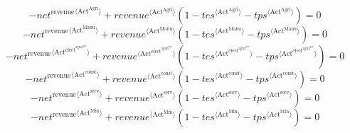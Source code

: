 \begin{equation}
-{{n\!e\!t}^{\mathrm{revenue}}}^{\langle \mathrm{Act}^{\mathrm{Agri}}\rangle} + {{{r\!e\!v\!e\!n\!u\!e}}^{\langle \mathrm{Act}^{\mathrm{Agri}}\rangle}} \left(1 - {{t\!e\!s}}^{\langle \mathrm{\mathrm{Act}^{\mathrm{Agri}}}\rangle} - {{t\!p\!s}}^{\langle \mathrm{\mathrm{Act}^{\mathrm{Agri}}}\rangle}\right) = 0
\end{equation}
\begin{equation}
-{{n\!e\!t}^{\mathrm{revenue}}}^{\langle \mathrm{Act}^{\mathrm{Manu}}\rangle} + {{{r\!e\!v\!e\!n\!u\!e}}^{\langle \mathrm{Act}^{\mathrm{Manu}}\rangle}} \left(1 - {{t\!e\!s}}^{\langle \mathrm{\mathrm{Act}^{\mathrm{Manu}}}\rangle} - {{t\!p\!s}}^{\langle \mathrm{\mathrm{Act}^{\mathrm{Manu}}}\rangle}\right) = 0
\end{equation}
\begin{equation}
-{{n\!e\!t}^{\mathrm{revenue}}}^{\langle \mathrm{Act}^{\mathrm{elect}^{\mathrm{agua}^{\mathrm{gas}}}}\rangle} + {{{r\!e\!v\!e\!n\!u\!e}}^{\langle \mathrm{Act}^{\mathrm{elect}^{\mathrm{agua}^{\mathrm{gas}}}}\rangle}} \left(1 - {{t\!e\!s}}^{\langle \mathrm{\mathrm{Act}^{\mathrm{elect}^{\mathrm{agua}^{\mathrm{gas}}}}}\rangle} - {{t\!p\!s}}^{\langle \mathrm{\mathrm{Act}^{\mathrm{elect}^{\mathrm{agua}^{\mathrm{gas}}}}}\rangle}\right) = 0
\end{equation}
\begin{equation}
-{{n\!e\!t}^{\mathrm{revenue}}}^{\langle \mathrm{Act}^{\mathrm{const}}\rangle} + {{{r\!e\!v\!e\!n\!u\!e}}^{\langle \mathrm{Act}^{\mathrm{const}}\rangle}} \left(1 - {{t\!e\!s}}^{\langle \mathrm{\mathrm{Act}^{\mathrm{const}}}\rangle} - {{t\!p\!s}}^{\langle \mathrm{\mathrm{Act}^{\mathrm{const}}}\rangle}\right) = 0
\end{equation}
\begin{equation}
-{{n\!e\!t}^{\mathrm{revenue}}}^{\langle \mathrm{Act}^{\mathrm{serv}}\rangle} + {{{r\!e\!v\!e\!n\!u\!e}}^{\langle \mathrm{Act}^{\mathrm{serv}}\rangle}} \left(1 - {{t\!e\!s}}^{\langle \mathrm{\mathrm{Act}^{\mathrm{serv}}}\rangle} - {{t\!p\!s}}^{\langle \mathrm{\mathrm{Act}^{\mathrm{serv}}}\rangle}\right) = 0
\end{equation}
\begin{equation}
-{{n\!e\!t}^{\mathrm{revenue}}}^{\langle \mathrm{Act}^{\mathrm{Min}}\rangle} + {{{r\!e\!v\!e\!n\!u\!e}}^{\langle \mathrm{Act}^{\mathrm{Min}}\rangle}} \left(1 - {{t\!e\!s}}^{\langle \mathrm{\mathrm{Act}^{\mathrm{Min}}}\rangle} - {{t\!p\!s}}^{\langle \mathrm{\mathrm{Act}^{\mathrm{Min}}}\rangle}\right) = 0
\end{equation}
